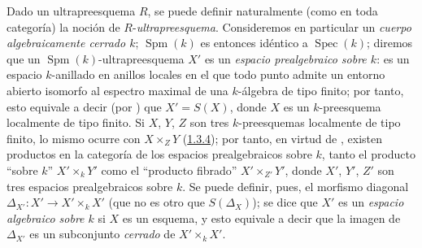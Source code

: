 \begin{env}[10.10.2]
\label{IV.10.10.2}
Dado un ultrapreesquema $R$, se puede definir naturalmente (como en toda categoría) la noción de $R$-\emph{ultrapreesquema}.
Consideremos en particular un \emph{cuerpo algebraicamente cerrado $k$}; $\operatorname{Spm}(k)$ es entonces idéntico a $\operatorname{Spec}(k)$; diremos que un $\operatorname{Spm}(k)$-ultrapreesquema $X'$ es un \emph{espacio prealgebraico sobre $k$}: es un espacio $k$-anillado en anillos locales en el que todo punto admite un entorno abierto isomorfo al espectro maximal de una $k$-álgebra de tipo finito; por tanto, esto equivale a decir (por ) que $X'=S(X)$, donde $X$ es un $k$-preesquema localmente de tipo finito.
Si $X$, $Y$, $Z$ son tres $k$-preesquemas localmente de tipo finito, lo mismo ocurre con $X\times_ZY$ \textup{(\hyperref[subsection:I.3.4]{1.3.4})}; por tanto, en virtud de , existen productos en la categoría de los espacios prealgebraicos sobre $k$, tanto el producto ``sobre $k$'' $X'\times_kY'$ como el ``producto fibrado'' $X'\times_{Z'}Y'$, donde $X'$, $Y'$, $Z'$ son tres espacios prealgebraicos sobre $k$.
Se puede definir, pues, el morfismo diagonal $\Delta_{X'}:X'\to X'\times_k X'$ (que no es otro que $S(\Delta_X)$); se dice que $X'$ es un \emph{espacio algebraico sobre $k$} si $X$ es un esquema, y esto equivale a decir que la imagen de $\Delta_{X'}$ es un subconjunto \emph{cerrado} de $X'\times_k X'$.
\end{env}

